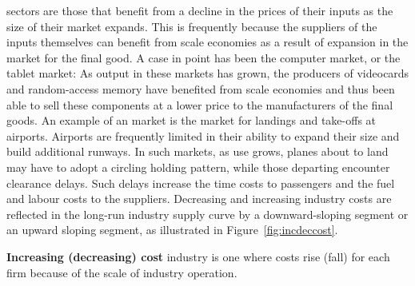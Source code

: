  sectors are those that benefit from a decline in
the prices of their inputs as the size of their market expands. This is
frequently because the suppliers of the inputs themselves can benefit from
scale economies as a result of expansion in the market for the final good. A
case in point has been the computer market, or the tablet market: As output
in these markets has grown, the producers of videocards and random-access
memory have benefited from scale economies and thus been able to sell these
components at a lower price to the manufacturers of the final goods. An
example of an  market is the market for landings and
take-offs at airports. Airports are frequently limited in their ability to
expand their size and build additional runways. In such markets, as use
grows, planes about to land may have to adopt a circling holding pattern,
while those departing encounter clearance delays. Such delays increase the
time costs to passengers and the fuel and labour costs to the suppliers. 
Decreasing and increasing industry costs are reflected in the long-run 
industry supply curve by a downward-sloping segment or an upward sloping 
segment, as illustrated in Figure~\ref{fig:incdeccost}.

\begin{DefBox}
	\textbf{Increasing (decreasing) cost} industry is one where costs rise (fall) for each firm because of the scale of industry operation.
\end{DefBox}